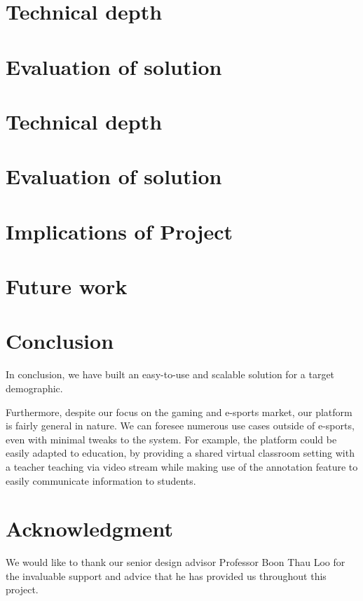 \documentclass[conference]{IEEEtran}
\begin{document}
\section{Technical depth}

\section{Evaluation of solution}


\section{Technical depth}

\section{Evaluation of solution}

\section{Implications of Project}

\section{Future work}

\section{Conclusion}

  In conclusion, we have built an easy-to-use and scalable solution for a target demographic.

  Furthermore, despite our focus on the gaming and e-sports market, our platform is fairly general in nature. We can foresee numerous use cases outside of e-sports, even with minimal tweaks to the system. For example, the platform could be easily adapted to education, by providing a shared virtual classroom setting with a teacher teaching via video stream while making use of the annotation feature to easily communicate information to students.

\section*{Acknowledgment}
We would like to thank our senior design advisor Professor Boon Thau Loo for the invaluable support and advice that he has provided us throughout this project.
\end{document}
